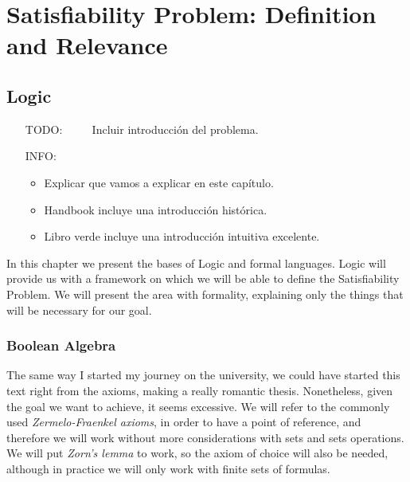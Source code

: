 
\part{Satisfiability Problem: Definition and Relevance} %

\label{Chapter1} %


\newcommand{\keyword}[1]{\textbf{#1}}
\newcommand{\tabhead}[1]{\textbf{#1}}
\newcommand{\code}[1]{\texttt{#1}}
\newcommand{\file}[1]{\texttt{\bfseries#1}}
\newcommand{\option}[1]{\texttt{\itshape#1}}


\chapter{Logic}
\begin{itemize}
\item[TODO:]$\qquad$ Incluir introducción del problema.

\item[INFO:]
  \begin{itemize}
  \item Explicar que vamos a explicar en este capítulo.
  \item Handbook incluye una introducción histórica.
  \item Libro verde incluye una introducción intuitiva excelente.
\end{itemize}
\end{itemize}


In this chapter we present the bases of Logic and formal languages. Logic will provide us with a framework on which we will be able to define the Satisfiability Problem. We will present the area with formality, explaining only the things that will be necessary for our goal.


\section{Boolean Algebra}

The same way I started my journey on the university, we could have started this text right from the axioms, making a really romantic thesis. Nonetheless, given the goal we want to achieve, it seems excessive. We will refer to the commonly used \emph{Zermelo-Fraenkel axioms}, in order to have a point of reference, and therefore we will work without more considerations with sets and sets operations. We will put \emph{Zorn's lemma} to work, so the axiom of choice will also be needed, although in practice we will only work with finite sets of formulas.\\

